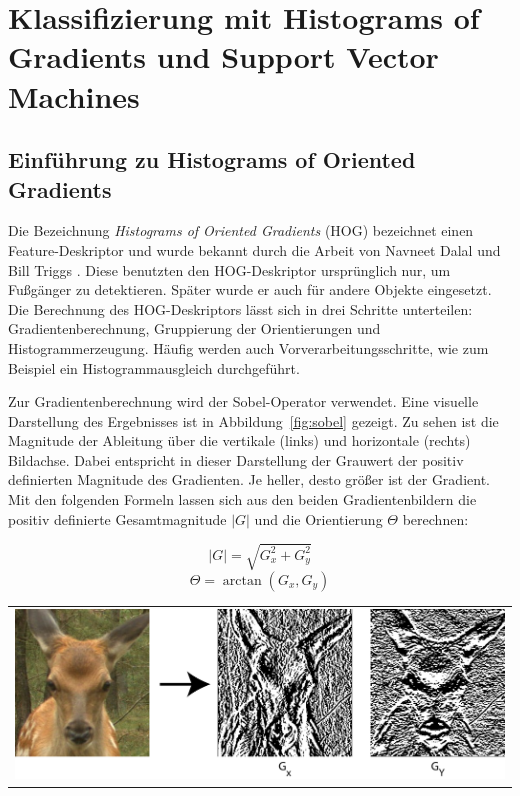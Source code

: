 \section{Klassifizierung mit Histograms of Gradients und Support Vector Machines} \label{sec:HOG}

\subsection{Einführung zu Histograms of Oriented Gradients} \label{ssec:intro_HOG}

Die Bezeichnung \textit{Histograms of Oriented Gradients} (HOG) bezeichnet einen Feature-Deskriptor und wurde bekannt durch die Arbeit von Navneet Dalal und Bill Triggs \cite{dalal05}. Diese benutzten den HOG-Deskriptor ursprünglich nur, um Fußgänger zu detektieren. Später wurde er auch für andere Objekte eingesetzt. Die Berechnung des HOG-Deskriptors lässt sich in drei Schritte unterteilen: Gradientenberechnung, Gruppierung der Orientierungen und Histogrammerzeugung. Häufig werden auch Vorverarbeitungsschritte, wie zum Beispiel ein Histogrammausgleich durchgeführt.

Zur Gradientenberechnung wird der Sobel-Operator verwendet. Eine visuelle Darstellung des Ergebnisses ist in Abbildung~\ref{fig:sobel} gezeigt. Zu sehen ist die Magnitude der Ableitung über die vertikale (links) und horizontale (rechts) Bildachse. Dabei entspricht in dieser Darstellung der Grauwert der positiv definierten Magnitude des Gradienten. Je heller, desto größer ist der Gradient. Mit den folgenden Formeln lassen sich aus den beiden Gradientenbildern die positiv definierte Gesamtmagnitude $|G|$ und die Orientierung $\Theta$ berechnen:

\begin{equation}
|G| = \sqrt{G_x^2 + G_y^2}
\end{equation}
\begin{equation}
\Theta = \arctan({G_x, G_y})
\end{equation}

\begin{center}
\begin{tabular}{c}
\includegraphics[trim={0 0cm 0cm 0cm},clip=true,width=13cm]{img/sobel.png}
\end{tabular}
\label{fig:sobel}
\end{center}

